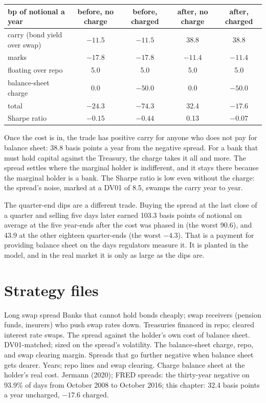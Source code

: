 \begin{center}
\small
\begin{tabular}{@{}lcccc@{}}
\toprule
bp of notional a year & before, no charge & before, charged & after, no charge & after, charged\\
\midrule
carry (bond yield over swap) & $-11.5$ & $-11.5$ & 38.8 & 38.8\\
marks & $-17.8$ & $-17.8$ & $-11.4$ & $-11.4$\\
floating over repo & 5.0 & 5.0 & 5.0 & 5.0\\
balance-sheet charge & 0.0 & $-50.0$ & 0.0 & $-50.0$\\
total & $-24.3$ & $-74.3$ & 32.4 & $-17.6$\\
Sharpe ratio & $-0.15$ & $-0.44$ & 0.13 & $-0.07$\\
\bottomrule
\end{tabular}
\end{center}

Once the cost is in, the trade has positive carry for anyone who does not pay for balance sheet: 38.8 basis points a year from the negative spread.
For a bank that must hold capital against the Treasury, the charge takes it all and more. The spread settles where the marginal holder is indifferent,
and it stays there because the marginal holder is a bank. The Sharpe ratio is low even without the charge: the spread's noise, marked at a DV01 of
8.5, swamps the carry year to year.

The quarter-end dips are a different trade. Buying the spread at the last close of a quarter and selling five days later earned 103.3 basis points of
notional on average at the five year-ends after the cost was phased in (the worst 90.6), and 43.9 at the other eighteen quarter-ends (the worst
$-4.3$). That is a payment for providing balance sheet on the days regulators measure it. It is planted in the model, and in the real market it is
only as large as the dips are.

\section{Strategy files}

\begin{strategyfile}{Long swap spread}\label{strat:s2:swap-spread-and-asset-swap-trades:long}
 Banks that cannot hold bonds cheaply; swap receivers (pension funds, insurers) who push swap rates down.
 Treasuries financed in repo; cleared interest rate swaps.
 The spread against the holder's own cost of balance sheet.
 DV01-matched; sized on the spread's volatility.
 The balance-sheet charge, repo, and swap clearing margin.
 Spreads that go further negative when balance sheet gets dearer.
 Years; repo lines and swap clearing.
 Charge balance sheet at the holder's real cost.
 Jermann (2020); FRED spreads: the thirty-year negative on 93.9\% of days from October 2008 to October 2016; this chapter: 32.4 basis
points a year uncharged, $-17.6$ charged.
\end{strategyfile}

